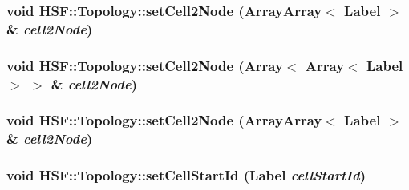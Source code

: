\label{classHSF_1_1Topology_a947e781930ba1bbf355970af289e35ba}
\hypertarget{classHSF_1_1Topology_a6a372d4d321126c3626c27f777753729}{
\subsubsection[{setCell2Node}]{\setlength{\rightskip}{0pt plus 5cm}void HSF::Topology::setCell2Node ({\bf ArrayArray}$<$ {\bf Label} $>$ \& {\em cell2Node})}}
\label{classHSF_1_1Topology_a6a372d4d321126c3626c27f777753729}
\hypertarget{classHSF_1_1Topology_a947e781930ba1bbf355970af289e35ba}{
\subsubsection[{setCell2Node}]{\setlength{\rightskip}{0pt plus 5cm}void HSF::Topology::setCell2Node (Array$<$ Array$<$ {\bf Label} $>$ $>$ \& {\em cell2Node})}}
\label{classHSF_1_1Topology_a947e781930ba1bbf355970af289e35ba}
\hypertarget{classHSF_1_1Topology_a6a372d4d321126c3626c27f777753729}{
\subsubsection[{setCell2Node}]{\setlength{\rightskip}{0pt plus 5cm}void HSF::Topology::setCell2Node ({\bf ArrayArray}$<$ {\bf Label} $>$ \& {\em cell2Node})}}
\label{classHSF_1_1Topology_a6a372d4d321126c3626c27f777753729}
\hypertarget{classHSF_1_1Topology_a531b20b476fb3cfc39526e949f20bb27}{
\subsubsection[{setCellStartId}]{\setlength{\rightskip}{0pt plus 5cm}void HSF::Topology::setCellStartId ({\bf Label} {\em cellStartId})}}
